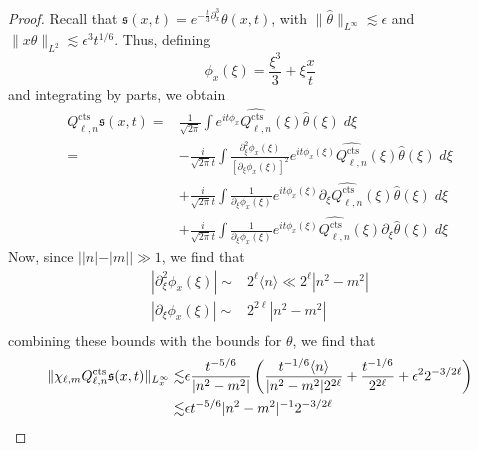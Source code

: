 \documentclass[letterpaper, reqno,final]{amsart}
\newcommand{\jBra}[1]{\langle #1 \rangle}
\newcommand{\fs}{\mathfrak{s}}
\newcommand{\tcts}{\text{cts}}
\begin{document}
\begin{proof}
    Recall that $\fs(x,t) = e^{-\frac{t}{3}\partial_x^3} \theta(x,t)$, with $\lVert \hat{\theta} \rVert_{L^\infty} \lesssim \epsilon$ and $\lVert x \theta \rVert_{L^2} \lesssim \epsilon^3 t^{1/6}$.  Thus, defining 
    \begin{equation*}
        \phi_x(\xi) = \frac{\xi^3}{3} + \xi \frac{x}{t}
    \end{equation*}
    and integrating by parts, we obtain
    \begin{equation*}\begin{split}
        Q_{\ell,n}^\tcts \fs(x,t) =& \frac{1}{\sqrt{2\pi}} \int e^{it\phi_x} \widehat{Q^\tcts_{\ell,n}}(\xi) \hat{\theta}(\xi)\;d\xi\\
        =& -\frac{i}{\sqrt{2\pi}t} \int \frac{\partial_\xi^2 \phi_x(\xi) }{[\partial_\xi \phi_x(\xi)]^2}e^{it\phi_x(\xi)} \widehat{Q^\tcts_{\ell,n}}(\xi) \hat{\theta}(\xi)\;d\xi\\
        &+ \frac{i}{\sqrt{2\pi}t} \int \frac{1}{\partial_\xi \phi_x(\xi)}e^{it\phi_x(\xi)} \partial_\xi \widehat{Q^\tcts_{\ell,n}}(\xi) \hat{\theta}(\xi)\;d\xi\\
        &+ \frac{i}{\sqrt{2\pi}t} \int \frac{1}{\partial_\xi \phi_x(\xi)}e^{it\phi_x(\xi)}  \widehat{Q^\tcts_{\ell,n}}(\xi) \partial_\xi \hat{\theta}(\xi)\;d\xi
    \end{split}\end{equation*}
    Now, since $||n| - |m|| \gg 1$, we find that
    \begin{equation*}\begin{split}
        |\partial_\xi^2 \phi_x(\xi)| \sim& 2^\ell \jBra{n} \ll 2^{\ell} |n^2 - m^2|\\
        |\partial_\xi \phi_x(\xi)| \sim& 2^{2\ell} |n^2 - m^2|\\
    \end{split}
    \end{equation*}
    combining these bounds with the bounds for $\theta$, we find that
    \begin{equation*}\begin{split}
        \lVert \chi_{\ell,m} Q_{\ell,n}^\tcts \fs(x,t) \rVert_{L^\infty_x} \lesssim& \epsilon \frac{t^{-5/6}}{|n^2-m^2|} \left( \frac{t^{-1/6} \jBra{n}}{|n^2 - m^2| 2^{2\ell}} + \frac{t^{-1/6}}{2^{2\ell}} + \epsilon^22^{-3/2\ell} \right)\\
        \lesssim& \epsilon t^{-5/6} |n^2 - m^2|^{-1} 2^{-3/2\ell}\qedhere
    \end{split}\end{equation*}
\end{proof}
\end{document}
